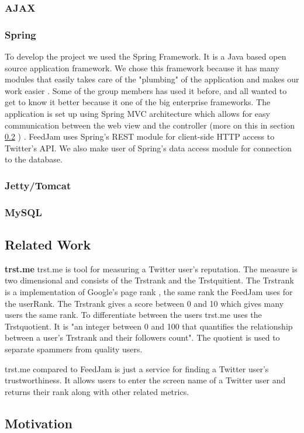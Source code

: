 \subsubsection{AJAX}%
\subsubsection{Spring} %
To develop the project we used the Spring Framework. It is a Java based open source application framework. We chose this framework because it has many modules that easily takes care of the "plumbing" of the application and makes our work easier \citep{SpringSourcec}. Some of the group members has used it before, and all wanted to get to know it better because it one of the big enterprise frameworks. The application is set up using Spring MVC architecture which allows for easy communication between the web view and the controller (more on this in section \ref{} \nameref{}) \citep{SpringSourcee}. FeedJam uses Spring's REST module for client-side HTTP access to Twitter's API. We also make user of Spring's data access module for connection to the database.

\subsubsection{Jetty/Tomcat} %
\subsubsection{MySQL} %

\subsection{Related Work}
{\bf trst.me} \newline
trst.me \citet{Infochimps2012b} is tool for measuring a Twitter user's reputation. The measure is two dimensional and consists of the Trstrank and the Trstquitient. The Trstrank is a implementation of Google's page rank \citep{Infochimps2012a}, the same rank the FeedJam uses for the userRank. The Trstrank gives a score between 0 and 10 which gives many users the same rank. To differentiate between the users trst.me uses the Trstquotient. It is "an integer between 0 and 100 that quantifies the relationship between a user's Trstrank and their followers count"\citep{Infochimps2012}. The quotient is used to separate spammers from quality users. 

trst.me compared to FeedJam is just a service for finding a Twitter user's trustworthiness. It allows users to enter the screen name of a Twitter user and returns their rank along with other related metrics.  

\subsection{Motivation} %

